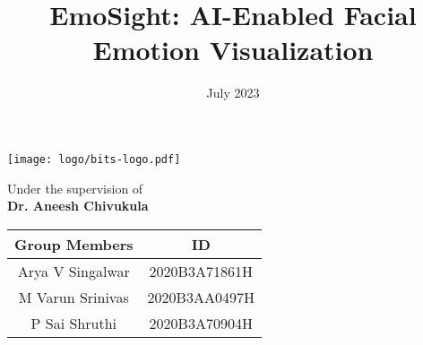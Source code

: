 \documentclass[11pt]{article}
\title{\huge \textbf{EmoSight: AI-Enabled Facial Emotion Visualization}\vspace{-2em}}
\date{\LARGE July 2023}
\begin{document}
\maketitle
{\par}
\vspace{0.25in}
\thispagestyle{empty}
\begin{center}
    \texttt{[image: logo/bits-logo.pdf]}\\
\end{center}
\vspace{0.25in}
{\centering \LARGE{Under the supervision of\\ \textbf{Dr. Aneesh Chivukula}}\par}
\vspace{.75in}
{\centering
\begin{table}[b]
    {\centering \LARGE
    \begin{tabular}{|c|c|} \hline \centering
        \textbf{Group Members} & \textbf{ID}\\\hline
        Arya V Singalwar& 2020B3A71861H \\\hline
        M Varun Srinivas  & 2020B3AA0497H\\
        \hline \centering
        P Sai Shruthi & 2020B3A70904H\\
        \hline
    \end{tabular}\par}
\end{table}\par}
\pagebreak
\end{document}
